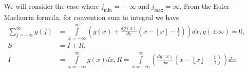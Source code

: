 \documentclass[titlepage,fleqn]{article}%
\begin{document}
\label{InfinitLimit}%
We will consider the case where $j_{\min_{{}}}=-$ $\infty$ and $j_{\max
}=\infty.$ From the Euler--Maclaurin formula, for convention sum to integral
we have%
\begin{align}%
{\displaystyle\sum\limits_{j=-\infty}^{\infty}}
g(j)  &  =%
{\displaystyle\int\limits_{x=-\infty}^{\infty}}
\left(  g(x)+\frac{dg(x)}{dx}\left(  x-\left\lfloor x\right\rfloor -\frac
{1}{2}\right)  \right)  dx,g(\pm\infty)=0,\label{EM1}\\
S  &  =I+R,\nonumber\\
I  &  =%
{\displaystyle\int\limits_{x=-\infty}^{\infty}}
g(x)dx,R=%
{\displaystyle\int\limits_{x=-\infty}^{\infty}}
\left(  \frac{dg(x)}{dx}\left(  x-\left\lfloor x\right\rfloor -\frac{1}%
{2}\right)  \right)  dx.\nonumber
\end{align}
\end{document}
